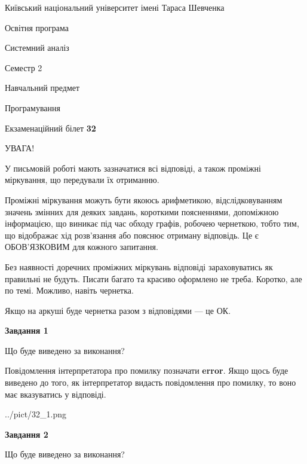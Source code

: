 \documentclass[12pt, ukrainian]{article}
\begin{document}
{{\begin {small}\par
{ \center  Київський національний університет імені Тараса Шевченка \par}
{\parbox {5 cm}{Освітня програма \hfill}{\parbox {7 cm}{Системний аналіз \hfill}}\parbox {6 cm}{\hfill Семестр 2}}\par
{\parbox {5 cm} {Навчальний предмет \hfill}\parbox {7 cm}{Програмування \hfill}\parbox {6cm}{\hfill}\par}\vspace{-7pt} \end{small}}{\center Екзаменаційний білет \No \textbf
{ 32 }\par}}
{
\begin {large}
УВАГА!

У письмовій роботі мають зазначатися всі відповіді, а також проміжні міркування, що передували їх отриманню.

Проміжні міркування можуть бути якоюсь арифметикою, відслідковуванням зна\-чень змінних для деяких завдань,
короткими поясненнями, допоміжною інформацією, що виникає під час обходу графів, робочею чернеткою,
тобто тим, що відображає хід розв’язання або пояснює отриману відповідь.
Це є ОБОВ’ЯЗКОВИМ для кожного запитання.

Без наявності доречних проміжних міркувань відповіді зараховуватись як правиль\-ні не будуть.
Писати багато та красиво оформлено не треба. Коротко, але по темі. Можли\-во, навіть чернетка.

Якщо на аркуші буде чернетка разом з відповідями --- це ОК.

\newpage

{\begin {center}\textbf{Завдання 1}\end {center}}\par
Що буде виведено за виконання?

Повідомлення інтерпретатора про помилку позначати \textbf{error}.
Якщо щось буде виведено до того, як інтерпретатор видасть повідомлення про помилку, 
то воно має вказуватись у відповіді. \par


\begin{center}
	{../pict/32_1.png}
\end{center}
\newpage

{\begin {center}\textbf{Завдання 2}\end {center}}\par
Що буде виведено за виконання?


\end{large}}
\end{document}
